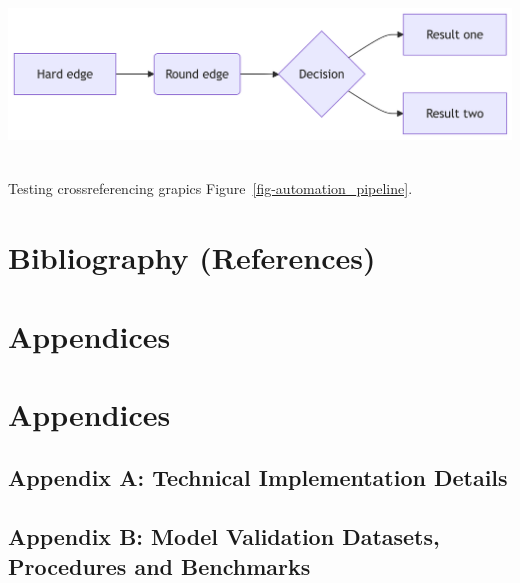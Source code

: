 \documentclass[
  11pt,
  letterpaper,
]{book}
\begin{document}
\includegraphics[width=6.88in,height=1.81in]{ref/references_files/figure-latex/mermaid-figure-1.png}

Testing crossreferencing grapics Figure~\ref{fig-automation_pipeline}.


\chapter*{Bibliography (References)}\label{bibliography-references}


\printbibliography[heading=none]

\cleardoublepage
{}
{}
\appendix

\chapter{Appendices}\label{appendices-1}

\chapter*{Appendices}\label{sec-appendices}


\section*{Appendix A: Technical Implementation
Details}\label{sec-appendix-technical}


\section*{Appendix B: Model Validation Datasets, Procedures and
Benchmarks}\label{sec-appendix-validation}
\end{document}
